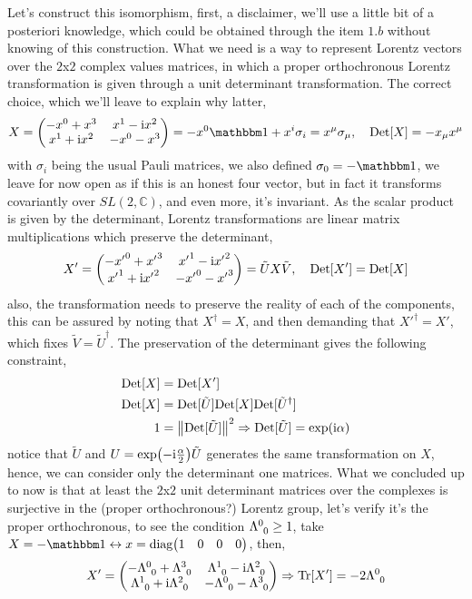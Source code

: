 Let's construct this isomorphism, first, a disclaimer, we'll use a little bit of a posteriori knowledge, which could be obtained through the item $1.b$ without 
knowing of this construction. What we need is a way to represent Lorentz vectors over the $2$x$2$ complex values matrices, in which a proper orthochronous Lorentz transformation 
is given through a unit determinant transformation. The correct choice, which we'll leave to explain why latter,
\begin{align}
    X = \mqty(-x^0+x^3& x^1-\im x^2\\x^1+\im x^2& -x^0-x^3)=-x^0\mathbbm 1 +x^i\sigma_i = x^\mu\sigma_\mu,\ \ \ \Det[X] = -x_\mu x^\mu
\end{align}
with $\sigma_i$ being the usual Pauli matrices, we also defined $\sigma_ 0 =-\mathbbm 1$, we leave for now open as if this is an honest four vector, 
but in fact it transforms covariantly over $SL(2,\mathbb C)$, and even more, it's invariant. As the scalar product is given by the determinant, 
Lorentz transformations are linear matrix multiplications which preserve the determinant,
\begin{align}
    X' = \mqty(-{x'}^0+{x'}^3& {x'}^1-\im {x'}^2\\{x'}^1+\im {x'}^2& -{x'}^0-{x'}^3)= \tilde U X \tilde V,\ \ \ \Det[X']=\Det[X]
\end{align}
also, the transformation needs to preserve the reality of each of the components, this can be assured by noting that $X^\dagger  =X$, and then 
demanding that ${X'}^\dagger = X'$, which fixes $\tilde V ={\tilde U}^\dagger$. The preservation of the determinant gives the following constraint,
\begin{align}
    \textup{Det} [X]&=\textup{Det} [X']\\
    \textup{Det} [X]&=\textup{Det} [\tilde U]\textup{Det} [X]\textup{Det} [{\tilde U}^\dagger]\\
    1&=\norm{\textup{Det} [\tilde U]}^2\Rightarrow \textup{Det} [\tilde U]=\exp(\textnormal{i} \alpha)
\end{align}
notice that $\tilde U$ and $U=\exp(-\textnormal{i}\frac\alpha2)\tilde U$ generates the same transformation on $X$, hence, we can consider only the determinant one 
matrices. What we concluded up to now is that at least the $2$x$2$ unit determinant matrices over the complexes is surjective in the (proper orthochronous?) Lorentz 
group, let's verify it's the proper orthochronous, to see the condition $\tensor{\Lambda}{^0_0}\geq 1$, take $X = -\mathbbm 1\leftrightarrow x=\textnormal{diag}\mqty(1&0&0&0)$, then, 
\begin{align}
    X'=\mqty(-\tensor{\Lambda}{^0_0}+\tensor{\Lambda}{^3_0}& \tensor{\Lambda}{^1_0}-\im \tensor{\Lambda}{^2_0}\\\tensor{\Lambda}{^1_0}+\im \tensor{\Lambda}{^2_0}& -\tensor{\Lambda}{^0_0}-\tensor{\Lambda}{^3_0})\Rightarrow \Tr[X'] = -2\tensor{\Lambda}{^0_0}
\end{align}
